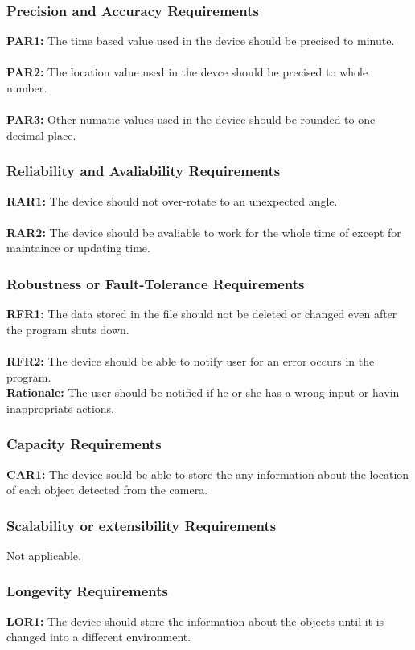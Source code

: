 \documentclass[12pt]{article}
\begin{document}
\subsubsection{Precision and Accuracy Requirements}
\textbf{PAR1:} The time based value used in the device should be precised to minute.\\\\
\textbf{PAR2:} The location value used in the devce should be precised to whole number.\\\\
\textbf{PAR3:} Other numatic values used in the device should be rounded to one decimal place.
\subsubsection{Reliability and Avaliability Requirements}
\textbf{RAR1:} The device should not over-rotate to an unexpected angle.\\\\
\textbf{RAR2:} The device should be avaliable to work for the whole time of except for maintaince or updating time.
\subsubsection{Robustness or Fault-Tolerance Requirements}
\textbf{RFR1:} The data stored in the file should not be deleted or changed even after the program shuts down.\\\\
\textbf{RFR2:} The device should be able to notify user for an error occurs in the program.\\
\textbf{Rationale:} The user should be notified if he or she has a wrong input or havin inappropriate actions.
\subsubsection{Capacity Requirements}
\textbf{CAR1:} The device sould be able to store the any information about the location of each object detected from the camera.
\subsubsection{Scalability or extensibility Requirements}
Not applicable.
\subsubsection{Longevity Requirements}
\textbf{LOR1:} The device should store the information about the objects until it is changed into a different environment.
\end{document}

